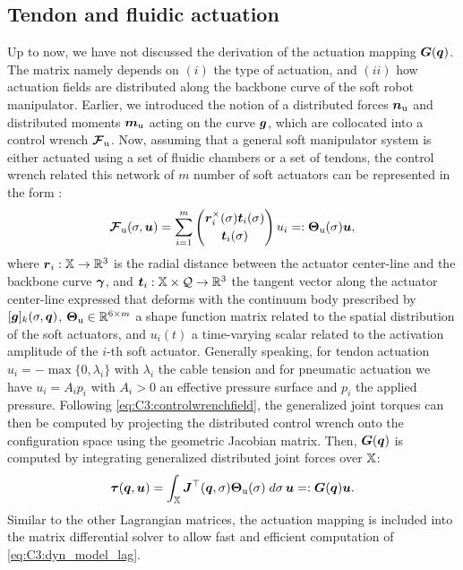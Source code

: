 \subsection{Tendon and fluidic actuation}
Up to now, we have not discussed the derivation of the actuation mapping ${\boldsymbol{G}}({\boldsymbol{q}})$. The matrix namely depends on $(i)$ the type of actuation, and $(ii)$ how actuation fields are distributed along the backbone curve of the soft robot manipulator. Earlier, we introduced the notion of a distributed forces ${\boldsymbol{n}}_\textrm{u}$ and distributed moments ${\boldsymbol{m}}_\textrm{u}$ acting on the curve ${\boldsymbol{g}}$, which are collocated into a control wrench ${\boldsymbol{\mathcal{F}}}_{\textrm{u}}$. Now, assuming that a general soft manipulator system is either actuated using a set of fluidic chambers or a set of tendons, the control wrench related this network of $m$ number of soft actuators can be represented in the form \cite{Renda2020,Boyer2021}:
%
\begin{equation}
{\boldsymbol{\mathcal{F}}}_{\textrm{u}}(\sigma,{\boldsymbol{u}}) = \sum_{i = 1}^m \begin{pmatrix}
{\boldsymbol{r}}_i^\times(\sigma) {\boldsymbol{t}}_i(\sigma) \\[0.25em] {\boldsymbol{t}}_i (\sigma)
\end{pmatrix} u_i =: {\boldsymbol{\Theta}}_{\textrm{u}}(\sigma) {\boldsymbol{u}},
\label{eq:C3:controlwrenchfield}
\end{equation}
%
where ${\boldsymbol{r}}_i: \mathbb{X} \to \mathbb{R}^3$ is the radial distance between the actuator center-line and the backbone curve ${\boldsymbol{\gamma}}$, and ${\boldsymbol{t}}_i: \mathbb{X} \times \mathcal{Q} \to \mathbb{R}^3$ the tangent vector along the actuator center-line expressed that deforms with the continuum body prescribed by $[{\boldsymbol{g}}]_k(\sigma,{\boldsymbol{q}})$, ${\boldsymbol{\Theta}}_\textrm{u} \in \mathbb{R}^{6 \times m}$ a shape function matrix related to the spatial distribution of the soft actuators, and $u_i(t)$ a time-varying scalar related to the activation amplitude of the $i$-th soft actuator. Generally speaking, for tendon actuation $u_i = -\max\{0,\lambda_i\}$ with $\lambda_i$ the cable tension and for pneumatic actuation we have $u_i = A_i p_i$ with $A_i > 0$ an effective pressure surface and $p_i$ the applied pressure. Following \eqref{eq:C3:controlwrenchfield}, the generalized joint torques can then be computed by projecting the distributed control wrench onto the configuration space using the geometric Jacobian matrix. Then, ${\boldsymbol{G}}({\boldsymbol{q}})$ is computed by integrating generalized distributed joint forces over $\mathbb{X}$:
%
\begin{equation}
\boldsymbol{\tau}({\boldsymbol{q}},{\boldsymbol{u}}) = \int_{\mathbb{X}} {\boldsymbol{J}}^\top({\boldsymbol{q}},\sigma) {\boldsymbol{\Theta}}_{\textrm{u}}(\sigma)\; d\sigma \,{\boldsymbol{u}} =: {\boldsymbol{G}}({\boldsymbol{q}}) {\boldsymbol{u}}.
\end{equation}
%
Similar to the other Lagrangian matrices, the actuation mapping is included into the matrix differential solver to allow fast and efficient computation of \eqref{eq:C3:dyn_model_lag}.

